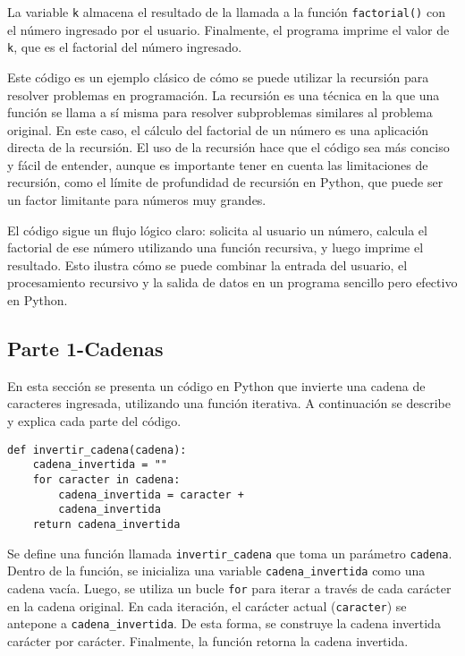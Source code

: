 \documentclass[conference]{IEEEtran}
\begin{document}
La variable \texttt{k} almacena el resultado de la llamada a la función \texttt{factorial()} con el número ingresado por el usuario. Finalmente, el programa imprime el valor de \texttt{k}, que es el factorial del número ingresado.

Este código es un ejemplo clásico de cómo se puede utilizar la recursión para resolver problemas en programación. La recursión es una técnica en la que una función se llama a sí misma para resolver subproblemas similares al problema original. En este caso, el cálculo del factorial de un número es una aplicación directa de la recursión. El uso de la recursión hace que el código sea más conciso y fácil de entender, aunque es importante tener en cuenta las limitaciones de recursión, como el límite de profundidad de recursión en Python, que puede ser un factor limitante para números muy grandes.

El código sigue un flujo lógico claro: solicita al usuario un número, calcula el factorial de ese número utilizando una función recursiva, y luego imprime el resultado. Esto ilustra cómo se puede combinar la entrada del usuario, el procesamiento recursivo y la salida de datos en un programa sencillo pero efectivo en Python.


\subsection{Parte 1-Cadenas}

En esta sección se presenta un código en Python que invierte una cadena de caracteres ingresada, utilizando una función iterativa. A continuación se describe y explica cada parte del código.

\begin{verbatim}
def invertir_cadena(cadena):
    cadena_invertida = "" 
    for caracter in cadena:
        cadena_invertida = caracter + 
        cadena_invertida
    return cadena_invertida
\end{verbatim}

Se define una función llamada \texttt{invertir\_cadena} que toma un parámetro \texttt{cadena}. Dentro de la función, se inicializa una variable \texttt{cadena\_invertida} como una cadena vacía. Luego, se utiliza un bucle \texttt{for} para iterar a través de cada carácter en la cadena original. En cada iteración, el carácter actual (\texttt{caracter}) se antepone a \texttt{cadena\_invertida}. De esta forma, se construye la cadena invertida carácter por carácter. Finalmente, la función retorna la cadena invertida.
\end{document}
